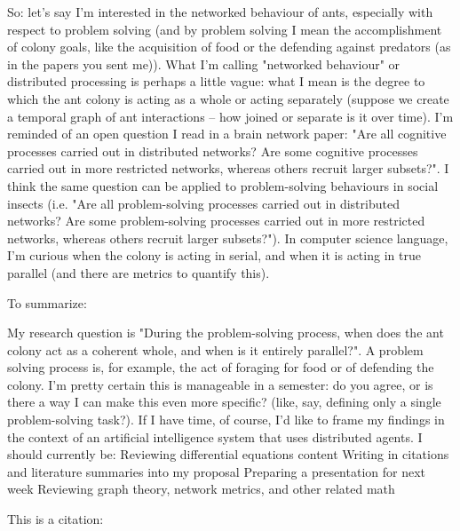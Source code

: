 \documentclass{nature}
\begin{document}
So: let's say I'm interested in the networked behaviour of ants, especially with respect to problem solving (and by problem solving I mean the accomplishment of colony goals, like the acquisition of food or the defending against predators (as in the papers you sent me)). What I'm calling "networked behaviour" or distributed processing is perhaps a little vague: what I mean is the degree to which the ant colony is acting as a whole or acting separately (suppose we create a temporal graph of ant interactions -- how joined or separate is it over time). I'm reminded of an open question I read in a brain network paper: "Are all cognitive processes carried out in distributed networks? Are some cognitive processes carried out in more restricted networks, whereas others recruit larger subsets?". I think the same question can be applied to problem-solving behaviours in social insects (i.e. "Are all problem-solving processes carried out in distributed networks? Are some problem-solving processes carried out in more restricted networks, whereas others recruit larger subsets?"). In computer science language, I'm curious when the colony is acting in serial, and when it is acting in true parallel (and there are metrics to quantify this).

To summarize:

    My research question is "During the problem-solving process, when does the ant colony act as a coherent whole, and when is it entirely parallel?". A problem solving process is, for example, the act of foraging for food or of defending the colony. I'm pretty certain this is manageable in a semester: do you agree, or is there a way I can make this even more specific? (like, say, defining only a single problem-solving task?). If I have time, of course, I'd like to frame my findings in the context of an artificial intelligence system that uses distributed agents.
    I should currently be:
        Reviewing differential equations content
        Writing in citations and literature summaries into my proposal
        Preparing a presentation for next week
        Reviewing graph theory, network metrics, and other related math


This is a citation:

\cite{pathfinding}


\end{document}
